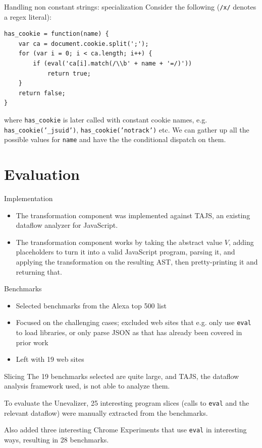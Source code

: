\documentclass{beamer}
\begin{document}
\begin{frame}[fragile]{Handling non constant strings: specialization}
Consider the following ({\tt /x/} denotes a regex literal):
\vspace{5mm}
\begin{verbatim}
has_cookie = function(name) {
    var ca = document.cookie.split(';');
    for (var i = 0; i < ca.length; i++) {
        if (eval('ca[i].match(/\\b' + name + '=/)'))
            return true;
    }
    return false;
}
\end{verbatim}
where {\tt has\_cookie} is later called with constant cookie names,
e.g. {\tt has\_cookie('\_jsuid')}, {\tt has\_cookie('notrack')} etc. We
can gather up all the possible values for {\tt name} and have the
the conditional dispatch on them.
\end{frame}
             
\section{Evaluation}

\begin{frame}{Implementation}
\begin{itemize}
\item The transformation component was implemented against TAJS, an existing
dataflow analyzer for JavaScript.
\item The transformation component works by taking the abstract value $V$,
adding placeholders to turn it into a valid JavaScript program, parsing it,
and applying the transformation on the resulting AST, then pretty-printing
it and returning that.
\end{itemize}
\end{frame}

\begin{frame}{Benchmarks}
\begin{itemize}
\item Selected benchmarks from the Alexa top 500 list
\item Focused on the challenging cases; excluded web sites that e.g.
only use {\tt eval} to load libraries, or only parse JSON as that has
already been covered in prior work
\item Left with 19 web sites
\end{itemize}
\end{frame}

\begin{frame}{Slicing}
The 19 benchmarks selected are quite large, and TAJS, the dataflow analysis
framework used, is not able to analyze them. \vspace{5mm}

To evaluate the Unevalizer, 25 interesting program slices (calls to
{\tt eval} and the relevant dataflow) were manually extracted from the
benchmarks. \vspace{5mm} 

Also added three interesting Chrome Experiments that use {\tt eval} in
interesting ways, resulting in 28 benchmarks.
\end{frame}  
\end{document}
